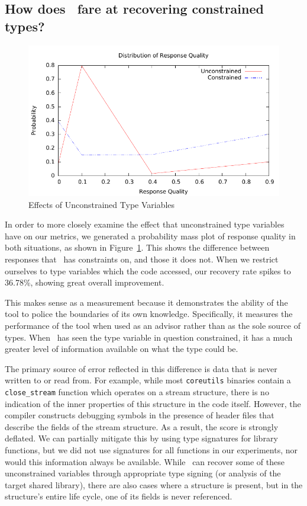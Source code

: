 \subsection{How does \bitr\ fare at recovering constrained types?}
\begin{figure}
	\begin{center}
\includegraphics[scale=1.1]{bitr/quality.pdf}
	\end{center}
\caption{Effects of Unconstrained Type Variables}
\label{fig:unconst}
\end{figure}

In order to more closely examine the effect that unconstrained type variables have on our metrics, we generated a probability mass plot of response quality in both situations, as shown in Figure~\ref{fig:unconst}. This shows the
difference between responses that \bitr\ has constraints on, and those it does not.
When we restrict ourselves to type variables which the code accessed, our recovery rate spikes to 36.78\%, showing great overall improvement.

This makes sense as a measurement because it demonstrates the ability of the tool to police the boundaries of its own knowledge. Specifically, it measures the performance of the tool when used as an advisor rather than as the sole source of types. When \bitr\ has seen the type variable in question constrained, it has a much greater level of information available on what the type could be.

The primary source of error reflected in this difference is data that is never written to or read from. For example, while most \texttt{coreutils} binaries contain a \texttt{close\_stream} function which operates on a stream structure, there is no indication of the inner properties of this structure in the code itself. However, the compiler constructs debugging symbols in the presence of header files that describe the fields of the stream structure. As a result, the score is strongly deflated.
We can partially mitigate this by using type signatures for library functions, but we did not use signatures for all functions in our experiments, nor would this information always be available.
While \bitr\ can recover some of these unconstrained variables through appropriate type signing (or analysis of the target shared library), there are also cases where a structure is present, but in the structure's entire life cycle, one of its fields is never referenced.

